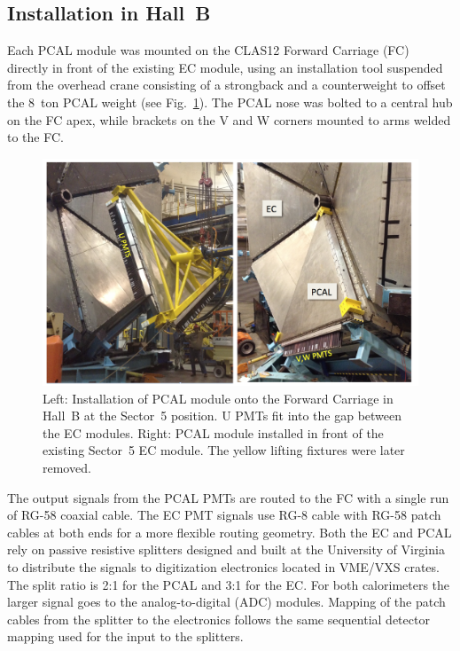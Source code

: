 \subsection{Installation in Hall~B}

Each PCAL module was mounted on the CLAS12 Forward Carriage (FC) directly in front of the existing EC module,
using an installation tool suspended from the overhead crane consisting of a strongback and a counterweight to
offset the 8~ton PCAL weight (see Fig.~\ref{fig:S5_1}). The PCAL nose was bolted to a central hub on the FC apex,
while brackets on the V and W corners mounted to arms welded to the FC.   

\begin{figure}[hbt]
\centering
\includegraphics[width=0.95\columnwidth,keepaspectratio]{img/S5_1.png}
\caption{Left: Installation of PCAL module onto the Forward Carriage in Hall~B at the Sector~5 position. U PMTs
  fit into the gap between the EC modules. Right: PCAL module installed in front of the existing Sector~5 EC
  module. The yellow lifting fixtures were later removed.}
\label{fig:S5_1}
\end{figure}

The output signals from the PCAL PMTs are routed to the FC with a single run of RG-58 coaxial cable. The EC PMT
signals use RG-8 cable with RG-58 patch cables at both ends for a more flexible routing geometry. Both the EC and
PCAL rely on passive resistive splitters designed and built at the University of Virginia to distribute the signals to 
digitization electronics located in VME/VXS crates. The split ratio is 2:1 for the PCAL and 3:1 for the EC. For both
calorimeters the larger signal goes to the analog-to-digital (ADC) modules. Mapping of the patch cables from the
splitter to the electronics follows the same sequential detector mapping used for the input to the splitters.

